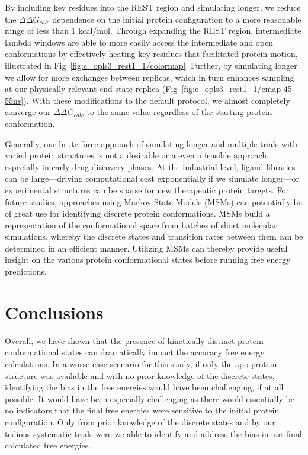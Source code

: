 \documentclass[journal=jctcce,manuscript=article]{achemso}
\begin{document}
By including key residues into the REST region and simulating longer, we reduce the $\Delta\Delta G_{calc}$ dependence on the initial protein configuration to a more reasonable range of less than 1 kcal/mol.
Through expanding the REST region, intermediate lambda windows are able to more easily access the intermediate and open conformations by effectively heating key residues that facilitated protein motion, illustrated in Fig~\ref{fig:c_opls3_rest1_1/colormap}.
Further, by simulating longer we allow for more exchanges between replicas, which in turn enhances sampling at our physically relevant end state replica (Fig~\ref{fig:c_opls3_rest1_1/cmap-45-55ns}).   
With these modifications to the default protocol, we almost completely converge our $\Delta\Delta G_{calc}$ to the same value regardless of the starting protein conformation.

Generally, our brute-force approach of simulating longer and multiple trials with varied protein structures is not a desirable or a even a feasible approach, especially in early drug discovery phases.
At the industrial level, ligand libraries can be large---driving computational cost exponentially if we simulate longer---or experimental structures can be sparse for new therapeutic protein targets.
For future studies, approaches using Markov State Models (MSMs)\cite{MSM} can potentially be of great use for identifying discrete protein conformations.
MSMs build a representation of the conformational space from batches of short molecular simulations, whereby the discrete states and transition rates between them can be determined in an efficient manner.
Utilizing MSMs can thereby provide useful insight on the various protein conformational states before running free energy predictions.

\section{Conclusions}
Overall, we have shown that the presence of kinetically distinct protein conformational states can dramatically impact the accuracy free energy calculations.
In a worse-case scenario for this study, if only the apo protein structure was available and with no prior knowledge of the discrete states, identifying the bias in the free energies would have been challenging, if at all possible.
It would have been especially challenging as there would essentially be no indicators that the final free energies were sensitive to the initial protein configuration.
Only from prior knowledge of the discrete states and by our tedious systematic trials were we able to identify and address the bias in our final calculated free energies.
\end{document}
